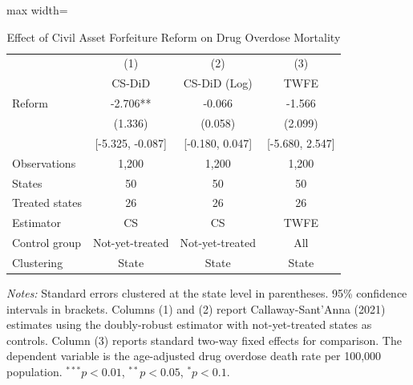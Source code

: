 \begin{table}[H]
\centering
\caption{Effect of Civil Asset Forfeiture Reform on Drug Overdose Mortality}
\label{tab:main}
\begin{adjustbox}{max width=\textwidth}
\begin{tabular}{lccc}
\toprule
 & (1) & (2) & (3) \\
 & CS-DiD & CS-DiD (Log) & TWFE \\
\midrule
Reform & -2.706** & -0.066 & -1.566 \\
 & (1.336) & (0.058) & (2.099) \\
 & [-5.325, -0.087] & [-0.180, 0.047] & [-5.680, 2.547] \\
\midrule
Observations & 1,200 & 1,200 & 1,200 \\
States & 50 & 50 & 50 \\
Treated states & 26 & 26 & 26 \\
Estimator & CS & CS & TWFE \\
Control group & Not-yet-treated & Not-yet-treated & All \\
Clustering & State & State & State \\
\bottomrule
\end{tabular}
\end{adjustbox}
\begin{tablenotes}[flushleft]
\small
\item \textit{Notes:} Standard errors clustered at the state level in parentheses. 95\% confidence intervals in brackets. Columns (1) and (2) report Callaway-Sant'Anna (2021) estimates using the doubly-robust estimator with not-yet-treated states as controls. Column (3) reports standard two-way fixed effects for comparison. The dependent variable is the age-adjusted drug overdose death rate per 100,000 population. $^{***}p<0.01$, $^{**}p<0.05$, $^{*}p<0.1$.
\end{tablenotes}
\end{table}
